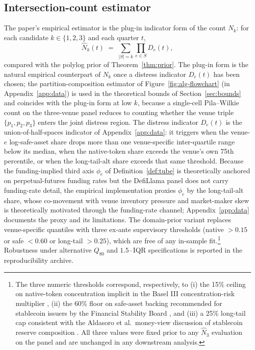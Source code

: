 \documentclass[12pt]{article}
\theoremstyle{sampledef}
\theoremstyle{sampleplain}
\theoremstyle{sampleremark}
\newcommand{\1}{\mathbf{1}}
\begin{document}
\subsection{Intersection-count estimator}\label{sec:estimator}

The paper's empirical estimator is the plug-in indicator form of
the count $N_k$: for each candidate $k \in \{1,2,3\}$ and each
quarter $t$,
\[
\hat N_k(t) \;=\; \sum_{|S|=k} \prod_{e \in S} D_e(t),
\]
compared with the polylog prior of Theorem~\ref{thm:prior}. The
plug-in form is the natural empirical counterpart of $N_k$ once a
distress indicator $D_e(t)$ has been chosen; the
partition-composition estimator of
Figure~\ref{fig:alg-flowchart} (in Appendix~\ref{app:data}) is used
in the theoretical bounds
of Section~\ref{sec:bounds} and coincides with the plug-in form
at low $k$, because a single-cell Pila--Wilkie count on the
three-venue panel reduces to counting whether the venue triple
$\{p_1, p_2, p_3\}$ enters the joint distress region.
The distress indicator $D_e(t)$ is the union-of-half-spaces
indicator of Appendix~\ref{app:data}: it triggers when the
venue-$e$ log-safe-asset share drops more than one venue-specific
inter-quartile range below its median, when the native-token share
exceeds the venue's own 75th percentile, or when the long-tail-alt
share exceeds that same threshold. Because the funding-implied
third axis $\phi_e$ of Definition~\ref{def:tube} is theoretically
anchored on perpetual-futures funding rates but the DefiLlama
panel does not carry funding-rate detail, the empirical
implementation proxies $\phi_e$ by the long-tail-alt share, whose
co-movement with venue inventory pressure and market-maker skew is
theoretically motivated through the funding-rate channel;
Appendix~\ref{app:data} documents the proxy and its limitations.
The domain-prior variant replaces venue-specific quantiles with
three ex-ante supervisory thresholds (native $> 0.15$ or
safe $< 0.60$ or long-tail $> 0.25$), which are free of any
in-sample fit.\footnote{The three numeric thresholds correspond,
respectively, to (i) the 15\% ceiling on native-token concentration
implicit in the Basel III concentration-risk multiplier
\citep{BCBS2021Crypto}, (ii) the 60\% floor on safe-asset backing
recommended for stablecoin issuers by the Financial Stability Board
\citep{FSB2023Crypto}, and (iii) a 25\% long-tail cap consistent with
the Aldasoro et al.\ money-view discussion of stablecoin reserve
composition \citep{Aldasoro2023Stablecoin}. All three values were
fixed prior to any $\hat N_3$ evaluation on the panel and are
unchanged in any downstream analysis.} Robustness
under alternative $Q_{80}$ and $1.5\cdot$IQR specifications is
reported in the reproducibility archive.
\end{document}
